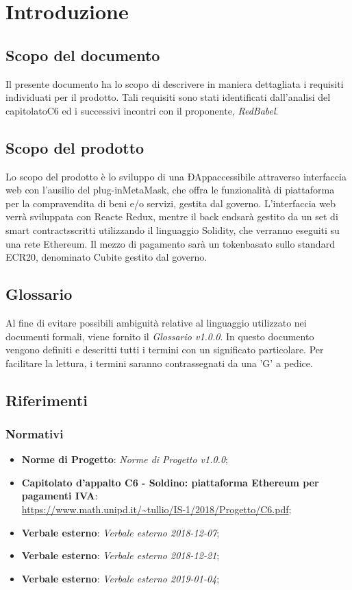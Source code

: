\section{Introduzione} 
\subsection{Scopo del documento}
Il presente documento ha lo scopo di descrivere in maniera dettagliata i requisiti individuati per il prodotto. Tali requisiti sono stati identificati dall'analisi del capitolato\glosp C6 ed i successivi incontri con il proponente, \textit{RedBabel}.
\subsection{Scopo del prodotto}
Lo scopo del prodotto è lo sviluppo di una ÐApp\glosp accessibile attraverso interfaccia web con l'ausilio del plug-in\glosp MetaMask\glo, che offra le funzionalità di piattaforma per la compravendita di beni e/o servizi, gestita dal governo\glo. L'interfaccia web verrà sviluppata con React\glosp e Redux\glo, mentre il back end\glosp sarà gestito da un set di smart contracts\glosp scritti utilizzando il linguaggio Solidity\glo, che verranno eseguiti su una rete Ethereum\glo.  Il mezzo di pagamento sarà un token\glosp basato sullo standard ECR20\glo, denominato Cubit\glosp e gestito dal governo\glo.

\subsection{Glossario}
Al fine di evitare possibili ambiguità relative al linguaggio utilizzato nei documenti formali, viene fornito il \textit{Glossario v1.0.0}. In questo documento vengono definiti e descritti tutti i termini con un significato particolare. Per facilitare la lettura, i termini saranno contrassegnati da una 'G' a pedice.
\subsection{Riferimenti}
\subsubsection{Normativi}
\begin{itemize}
	\item \textbf{Norme di Progetto}: \textit{Norme di Progetto v1.0.0};

	\item \textbf{Capitolato d'appalto C6 - Soldino: piattaforma Ethereum per pagamenti IVA}: \\ \url{ https://www.math.unipd.it/~tullio/IS-1/2018/Progetto/C6.pdf};
	\item \textbf{Verbale esterno}: \textit{Verbale esterno 2018-12-07};
	\item \textbf{Verbale esterno}: \textit{Verbale esterno 2018-12-21};
	\item \textbf{Verbale esterno}: \textit{Verbale esterno 2019-01-04};
\end{itemize}
